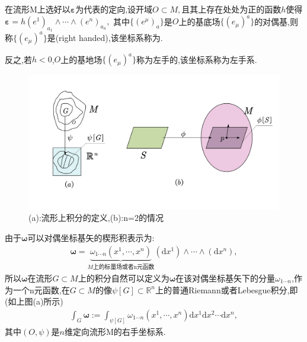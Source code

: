 在流形M上选好以$\boldsymbol{\varepsilon}$为代表的定向,设开域$O\subset M,$且其上存在处处为正的函数$h$使得$\boldsymbol{\varepsilon}=h(e^1)_{a_1}\wedge\cdots\wedge(e^n)_{a_n},$ 其中$\{(e^\mu)_a\}$是$O$上的基底场$\{(e_\mu)^a\}$的对偶基,则称$\{(e_\mu)^a\}$是(right handed),该坐标系称为.
\begin{remark}
    反之,若$h<0$,$O$上的基地场$\{(e_\mu)^a\}$称为左手的,该坐标系称为左手系.
\end{remark}
\begin{figure}[htbp]
    \centering
 \includegraphics[width=\textwidth]{img/5-2.png}
    \caption{(a):流形上积分的定义,(b):n=2的情况}
    \label{fig:5-2}
\end{figure}
由于$\boldsymbol{\omega}$可以对偶坐标基矢的楔形积表示为:
\begin{align}
\boldsymbol{\omega}=\underset{M\text{上的标量场或者n元函数}}{\underbrace{\omega_{1\cdots n}(x^1,\cdots,x^n)}}(\text{d}x^{1})\wedge\cdots\wedge(\text{d}x^{n}),
\end{align}
所以$\boldsymbol{\omega}$在流形$G\subset M$上的积分自然可以定义为$\boldsymbol{\omega}$在该对偶坐标基矢下的分量$\omega_{1\cdots n}$,作为一个n元函数,在$G\subset M$的像$\psi[G]\subset \mathbb{R}^n$上的普通Riemann或者Lebesgue积分,即(如上图(a)所示)
\begin{align}
 \int_G \boldsymbol{\omega}:=\int_{\psi[G]}\omega_{1\cdots n}(x^1,\cdots,x^n)\mathrm{d}x^1\mathrm{d}x^2\cdots \mathrm{d}x^n,
\end{align}
其中$(O,\psi)$是$n$维定向流形M的右手坐标系.
